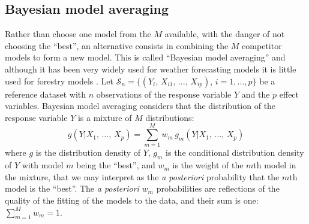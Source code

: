\subsection{Bayesian model averaging}

Rather than choose one model from the $M$ available, with the danger of not choosing the ``best'', an alternative consists in combining the $M$ competitor models to form a new model. This is called ``Bayesian model averaging'' and although it has been very widely used for weather forecasting models \citep{raftery05,furrer07,berliner08,smith09} it is little used for forestry models \citep{li08,picard12}.
Let
$\mathcal{S}_n=\{(Y_i,\,X_{i1},\,\ldots,\,X_{ip}),\,i=1,\ldots,p\}$
be a reference dataset with $n$ observations of the response variable $Y$ and the $p$ effect variables. Bayesian model averaging considers that the distribution of the response variable $Y$ is a mixture of $M$ distributions:
\[
g(Y|X_1,\,\ldots,\,X_p)=\sum_{m=1}^Mw_m\,g_m(Y|X_1,\,\ldots,\,X_p)
\]
where $g$ is the distribution density of $Y$, $g_m$ is the conditional distribution density of $Y$ with model $m$ being the ``best'', and $w_m$ is the weight of the $m$th model in the mixture, that we may interpret as the \textit{a posteriori} probability that the 
$m$th model is the ``best''. The \textit{a posteriori} $w_m$ probabilities are reflections of the quality of the fitting of the models to the data, and their sum is one:
$\sum_{m=1}^Mw_m=1$.

